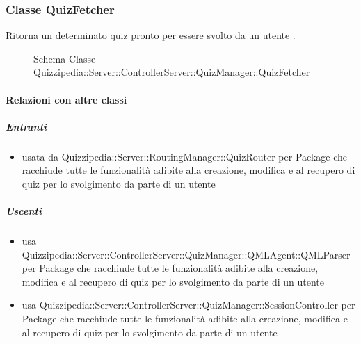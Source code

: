 \subsubsection{Classe QuizFetcher}
Ritorna un determinato quiz pronto per essere svolto da un utente .
\begin{figure}[H]
\centering
\noindent{}
\caption[Schema Classe QuizFetcher]{Schema Classe Quizzipedia::Server::ControllerServer::QuizManager::QuizFetcher}
\end{figure}
\paragraph{Relazioni con altre classi}
\subparagraph{Entranti}
\begin{itemize}
\item usata da Quizzipedia::Server::RoutingManager::QuizRouter per Package che racchiude tutte le funzionalità adibite alla creazione, modifica e al recupero di quiz per lo svolgimento da parte di un utente
\end{itemize}
\subparagraph{Uscenti}
\begin{itemize}
\item usa Quizzipedia::Server::ControllerServer::QuizManager::QMLAgent::QMLParser per Package che racchiude tutte le funzionalità adibite alla creazione, modifica e al recupero di quiz per lo svolgimento da parte di un utente
\item usa Quizzipedia::Server::ControllerServer::QuizManager::SessionController per Package che racchiude tutte le funzionalità adibite alla creazione, modifica e al recupero di quiz per lo svolgimento da parte di un utente
\end{itemize}

